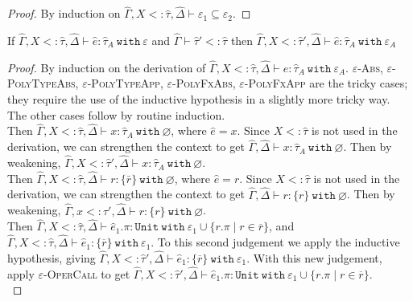 \documentclass{llncs}
\newcommand{\keywadj}[1]{\mathtt{#1}}
\newcommand{\keyw}[1]{\keywadj{#1}~}
\newcommand{\kw}[1]{\keyw{ #1 }}
\newcommand{\kwa}[1]{\keywadj{ #1 }}
\newcommand{\Unit}[0]{ \kwa{Unit} }
\begin{document}
\begin{proof} By induction on $\hat \Gamma, X <: \hat \tau, \hat \Delta \vdash \varepsilon_1 \subseteq \varepsilon_2$.

\end{proof}

\hrulefill

\begin{lemma}
If $\hat \Gamma, X <: \hat \tau, \hat \Delta \vdash \hat e: \hat \tau_A~\kw{with} \varepsilon$ and $\hat \Gamma \vdash \hat \tau' <: \hat \tau$ then $\hat \Gamma, X <: \hat \tau', \hat \Delta \vdash \hat e: \hat \tau_A~\kw{with} \varepsilon_A$
\end{lemma}

\begin{proof} By induction on the derivation of $\hat \Gamma, X <: \hat \tau, \hat \Delta \vdash \hat e: \hat \tau_A~\kw{with} \varepsilon_A$. \textsc{$\varepsilon$-Abs, $\varepsilon$-PolyTypeAbs, $\varepsilon$-PolyTypeApp, $\varepsilon$-PolyFxAbs, $\varepsilon$-PolyFxApp} are the tricky cases; they require the use of the inductive hypothesis in a slightly more tricky way. The other cases follow by routine induction. \\

 Then $\hat \Gamma, X <: \hat \tau, \hat \Delta \vdash x: \hat \tau_A~\kw{with} \varnothing$, where $\hat e = x$. Since $X <: \hat \tau$ is not used in the derivation, we can strengthen the context to get $\hat \Gamma, \hat \Delta \vdash x: \hat \tau_A~\kw{with} \varnothing$. Then by weakening, $\hat \Gamma, X <: \hat \tau', \hat \Delta \vdash x: \hat \tau_A~\kw{with} \varnothing$.\\

 Then $\hat \Gamma, X <: \hat \tau, \hat \Delta \vdash r: \{ \bar r \}~\kw{with} \varnothing$, where $\hat e = r$. Since $X <: \hat \tau$ is not used in the derivation, we can strengthen the context to get $\hat \Gamma, \hat \Delta \vdash r: \{ r \}~\kw{with} \varnothing$. Then by weakening, $\hat \Gamma, x <: \hat \tau', \hat \Delta \vdash r: \{ r \}~\kw{with} \varnothing$. \\

 Then $\hat \Gamma, X <: \hat \tau, \hat \Delta \vdash \hat e_1.\pi: \Unit~\kw{with} \varepsilon_1 \cup \{ r.\pi \mid r \in \overline{r} \}$, and $\hat \Gamma, X <: \hat \tau, \hat \Delta \vdash \hat e_1: \{ \overline{r} \}~\kw{with} \varepsilon_1$. To this second judgement we apply the inductive hypothesis, giving $\hat \Gamma, X <: \hat \tau', \hat \Delta \vdash \hat e_1: \{ \overline{r} \}~\kw{with} \varepsilon_1$. With this new judgement, apply \textsc{$\varepsilon$-OperCall} to get $\hat \Gamma, X <: \hat \tau', \hat \Delta \vdash \hat e_1.\pi: \Unit~\kw{with} \varepsilon_1 \cup \{ r.\pi \mid r \in \overline{r} \}$.\\


\end{proof}
\end{document}
